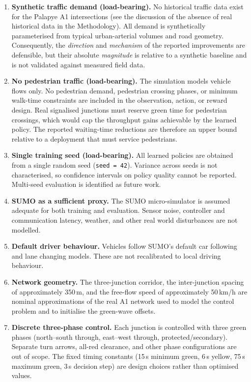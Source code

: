 ﻿\documentclass[11pt, a4paper]{report}
\begin{document}
\begin{enumerate}
    \item \textbf{Synthetic traffic demand (load-bearing).} No historical traffic data exist for the Palapye A1 intersections (see the discussion of the absence of real historical data in the Methodology). All demand is synthetically parameterised from typical urban-arterial volumes and road geometry. Consequently, the \emph{direction} and \emph{mechanism} of the reported improvements are defensible, but their absolute \emph{magnitude} is relative to a synthetic baseline and is not validated against measured field data.

    \item \textbf{No pedestrian traffic (load-bearing).} The simulation models vehicle flows only. No pedestrian demand, pedestrian crossing phases, or minimum walk-time constraints are included in the observation, action, or reward design. Real signalised junctions must reserve green time for pedestrian crossings, which would cap the throughput gains achievable by the learned policy. The reported waiting-time reductions are therefore an upper bound relative to a deployment that must service pedestrians.

    \item \textbf{Single training seed (load-bearing).} All learned policies are obtained from a single random seed (\texttt{seed = 42}). Variance across seeds is not characterised, so confidence intervals on policy quality cannot be reported. Multi-seed evaluation is identified as future work.

    \item \textbf{SUMO as a sufficient proxy.} The SUMO micro-simulator is assumed adequate for both training and evaluation. Sensor noise, controller and communication latency, weather, and other real world disturbances are not modelled.

    \item \textbf{Default driver behaviour.} Vehicles follow SUMO's default car following and lane changing models. These are not recalibrated to local driving behaviour.

    \item \textbf{Network geometry.} The three-junction corridor, the inter-junction spacing of approximately 350\,m, and the free-flow speed of approximately 50\,km/h are nominal approximations of the real A1 network used to model the control problem and to initialise the green-wave offsets.

    \item \textbf{Discrete three-phase control.} Each junction is controlled with three green phases (north--south through, east--west through, protected/secondary). Separate turn arrows, all-red clearance, and other phase configurations are out of scope. The fixed timing constants (15\,s minimum green, 6\,s yellow, 75\,s maximum green, 3\,s decision step) are design choices rather than optimised values.


\end{enumerate}
\end{document}
